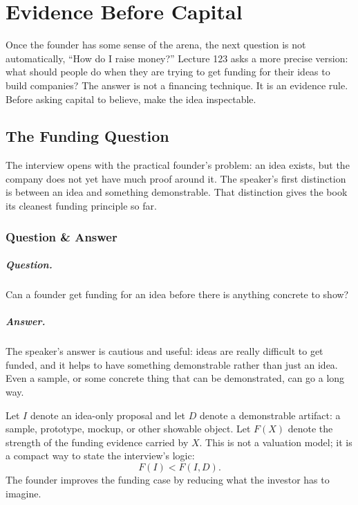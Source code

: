 \documentclass[11pt,oneside]{book}
\begin{document}
\chapter{Evidence Before Capital}

Once the founder has some sense of the arena, the next question is not automatically, ``How do I raise money?'' Lecture 123 asks a more precise version: what should people do when they are trying to get funding for their ideas to build companies? The answer is not a financing technique. It is an evidence rule. Before asking capital to believe, make the idea inspectable.

\section{The Funding Question}

The interview opens with the practical founder's problem: an idea exists, but the company does not yet have much proof around it. The speaker's first distinction is between an idea and something demonstrable. That distinction gives the book its cleanest funding principle so far.

\subsection{Question \& Answer}

\paragraph{Question.}
Can a founder get funding for an idea before there is anything concrete to show?

\paragraph{Answer.}
The speaker's answer is cautious and useful: ideas are really difficult to get funded, and it helps to have something demonstrable rather than just an idea. Even a sample, or some concrete thing that can be demonstrated, can go a long way.

Let \(I\) denote an idea-only proposal and let \(D\) denote a demonstrable artifact: a sample, prototype, mockup, or other showable object. Let \(F(X)\) denote the strength of the funding evidence carried by \(X\). This is not a valuation model; it is a compact way to state the interview's logic:
\[
F(I)<F(I,D).
\]
The founder improves the funding case by reducing what the investor has to imagine.
\end{document}
